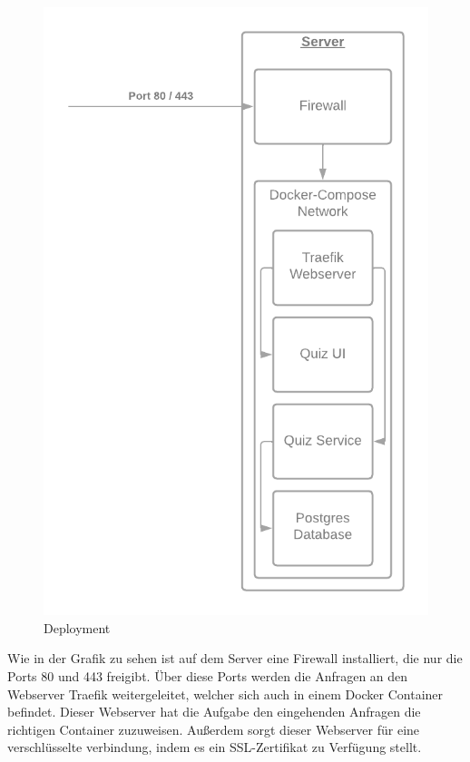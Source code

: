 \begin{figure}[H]
  \includegraphics[width=\linewidth]{img/Hosting.png}
  \caption{Deployment}
  \label{fig:deployment}
\end{figure}

\noindent Wie in der Grafik zu sehen ist auf dem Server eine Firewall installiert, die nur die Ports 80 und 443
freigibt. Über diese Ports werden die Anfragen an den Webserver Traefik weitergeleitet, welcher sich auch
in einem Docker Container befindet. Dieser Webserver hat die Aufgabe den eingehenden Anfragen die richtigen
Container zuzuweisen. Außerdem sorgt dieser Webserver für eine verschlüsselte verbindung, 
indem es ein SSL-Zertifikat zu Verfügung stellt.\newline

